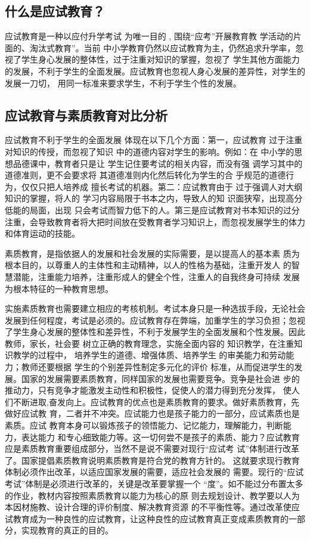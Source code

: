 \documentclass[UTF8]{ctexart}
\begin{document}
	\subsection{什么是应试教育？}
	应试教育是一种以应付升学考试 为唯一目的 , 围绕“应考”开展教育教 学活动的片面的、淘汰式教育”。当前 中小学教育仍然以应试教育为主，仍然追求升学率，忽视了学生身心发展的整体性，过于注重对知识的掌握，忽视了 学生其他方面能力的发展，不利于学生的全面发展。应试教育也忽视人身心发展的差异性，对学生的发展一刀切， 用同一标准来要求学生，不利于学生个性的发展\textsuperscript{\cite{XQ}}。
	\subsection{应试教育与素质教育对比分析}
	\par{应试教育不利于学生的全面发展 体现在以下几个方面：第一，应试教育 过于注重对知识的传授，而忽视了知识 中的道德内容对学生的影响。例如：在 中小学的思想品德课中，教育者只是让 学生记住要考试的相关内容，而没有强 调学习其中的道德准则，更不会要求将 其道德准则内化然后转化为学生的合 乎规范的道德行为，仅仅只把人培养成 擅长考试的机器。第二：应试教育由于 过于强调人对大纲知识的掌握，将人的 学习内容局限于书本之内，导致人的知 识面狭窄，出现高分低能的局面，出现 只会考试而智力低下的人。第三是应试教育对书本知识的过分注重，会导致教育者将大把时间放在受教育者学习知识上，而忽视发展学生的体力和体育运动的技能。}
	\par{素质教育，是指依据人的发展和社会发展的实际需要，是以提高人的基本素 质为根本目的，以尊重人的主体性和主动精神，以人的性格为基础，注重开发人 的智慧潜能，注重能力培养，注重形成人的健全个性，注重人的自我终身可持续 发展为根本特征的一种教育思想。}
	\par{实施素质教育也需要建立相应的考核机制。考试本身只是一种选拔手段，无论社会发展到任何程度，考试是必须的。应试教育存在弊端，加重学生的学习负担；忽视了学生身心发展的整体性和差异性，不利于发展学生的全面发展和个性发展。因此教师，家长，社会要 树立正确的教育理念，实施全面内容的 知识教学，在注重知识教学的过程中， 培养学生的道德、增强体质、培养学生 的审美能力和劳动能力；教师还要根据 学生的个别差异性制定多元化的评价 标准，从而促进学生的发展。国家的发展需要素质教育，同样国家的发展也需要竞争。竞争是社会进 步的推动力，只有竞争才能激发主动性和积极性，促使人的潜力得到充分发挥， 使人们不断进取,奋发向上。应试教育的优点也是素质教育的要求。做好素质教育，先做好应试教 育，二者并不冲突。应试能力也是孩子能力的一部分，应试素质也是素质。应试 教育本身可以锻炼孩子的领悟能力、记忆能力，理解能力，判断能力，表达能力 和专心细致能力等。这一切何尝不是孩子的素质、能力？应试教育应是素质教育重要组成部分，当然不是说不需要对现行“应试考 试”体制进行改革了。国家提倡素质教育说明素质教育是符合党的教育方针的。 这就要求现行教育体制必须作出改革，以适应国家发展的需要，适应社会发展的 需要。现行的“应试考试”体制是必须进行改革的，关键是改革要掌握一个 “度”\textsuperscript{\cite{CZJ}}。如不能过分布置太多的作业，教材内容按照素质教育以能力为核心的原 则去规划设计、教学要以人为本因材施教、设计合理的评价制度、解决教育资源 的不平衡性等。通过改革使应试教育成为一种良性的应试教育，让这种良性的应试教育真正变成素质教育的一部分，实现教育的真正的目的。}
\end{document}
